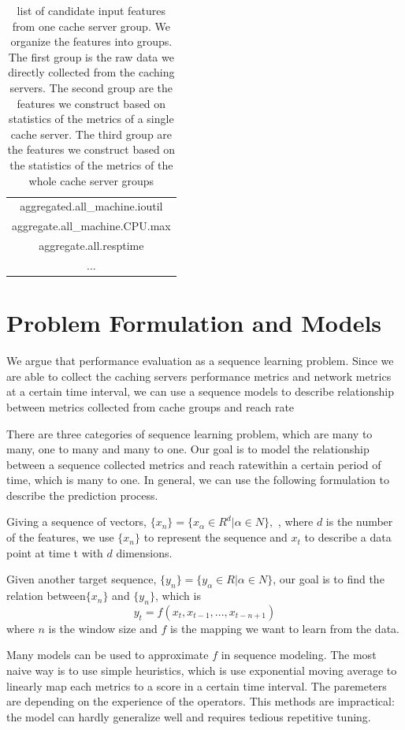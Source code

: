 \documentclass[5p]{elsarticle}
\newcommand{\dabiaolv}{reach rate}
\begin{document}
\begin{table}[]
\begin{tabular}{|c|}
aggregated.all\_machine.ioutil\\
aggregate.all\_machine.CPU.max\\
aggregate.all.resptime\\
...\\
\hline
\end{tabular}
\caption{list of candidate input features from one cache server group. We organize the features into groups. The first group is the raw data we directly collected from the caching servers. The second group are the features we construct based on statistics of the metrics of a single cache server. The third group are the features we construct based on the statistics of the metrics of the whole cache server groups}
\label{my-label}
\end{table}

\section{Problem Formulation and Models}
We argue that performance evaluation as a sequence learning problem. Since we are able to collect the caching servers performance metrics and network metrics at a certain time interval, we can use a sequence models to describe relationship between metrics collected from  cache groups and \dabiaolv

There are three categories of sequence learning problem, which are many to many, one to many and many to one. Our goal is to model the relationship between a sequence collected metrics and \dabiaolv within a certain period of time, which is many to one. In general, we can use the following formulation to describe the prediction process.

Giving a sequence of vectors, $\{x_n\}=\{x_{\alpha} \in R^{d}|\alpha \in N\}, $ , where $d$ is the number of the features, we use $\{x_n\}$ to represent the sequence and $x_t$ to describe a data point at time t with $d$ dimensions.

Given another target sequence, $\{y_n\}=\{y_{\alpha} \in R|\alpha \in N\}$, our goal is to find the relation between$\{x_n\}$ and $\{y_n\}$, which is 
$$y_t=f(x_{t},x_{t-1},...,x_{t-n+1})$$
where $n$ is the window size and $f$ is the mapping we want to learn from the data.

Many models can be used to approximate $f$ in sequence modeling. The most naive way is to use simple heuristics, which is use exponential moving average to linearly map each metrics to a score in a certain time interval. The paremeters are depending on the experience of the operators. This methods are impractical: the model can hardly generalize well and requires tedious repetitive tuning.
\end{document}
